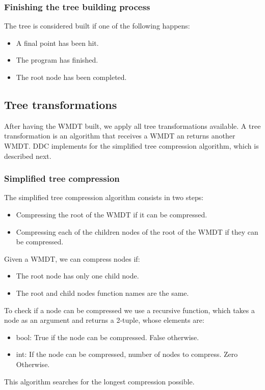 \subsubsection{Finishing the tree building process}
The tree is considered built if one of the following happens:
\begin{itemize}
    \item A final point has been hit.
    \item The program has finished.
    \item The root node has been completed.
\end{itemize}
\subsection{Tree transformations}
After having the WMDT built, we apply all tree transformations available.
A tree transformation is an algorithm that receives a WMDT an returns another WMDT.
DDC implements for the simplified tree compression algorithm, which is described next.
\subsubsection{Simplified tree compression}
The simplified tree compression algorithm consists in two steps:
\begin{itemize}
    \item Compressing the root of the WMDT if it can be compressed.
    \item Compressing each of the children nodes of the root of the WMDT if they can be compressed.
\end{itemize}
Given a WMDT, we can compress nodes if:
\begin{itemize}
    \item The root node has only one child node.
    \item The root and child nodes function names are the same.
\end{itemize}
To check if a node can be compressed we use a recursive function, which takes a node as an argument and returns a 2-tuple, whose elements are:
\begin{itemize}
    \item bool: True if the node can be compressed. False otherwise.
    \item int: If the node can be compressed, number of nodes to compress. Zero Otherwise.
\end{itemize}
This algorithm searches for the longest compression possible.

